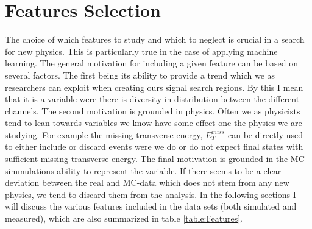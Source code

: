 \section{Features Selection}
The choice of which features to study and which to neglect is crucial in a search for new physics. This is particularly true 
in the case of applying machine learning. The general motivation for including a given feature can be based on several factors. 
The first being its ability to provide a trend which we as researchers can exploit when creating ours signal search regions. By this I mean
that it is a variable were there is diversity in distribution between the different channels. The second motivation is grounded in 
physics. Often we as physicists tend to lean towards variables we know have some effect one the physics we are studying. For 
example the missing transverse energy, $E_T^{miss}$ can be directly used to either include or discard events were we do or do not expect final states
with sufficient missing transverse energy. The final motivation is grounded in the \ac{MC}-simmulations ability to represent the variable.
If there seems to be a clear deviation between the real and \ac{MC}-data which does not stem from any new physics, we tend to discard
them from the analysis. In the following sections I will discuss the various features included in the data sets (both simulated and measured),
which are also summarized in table \ref{table:Features}.